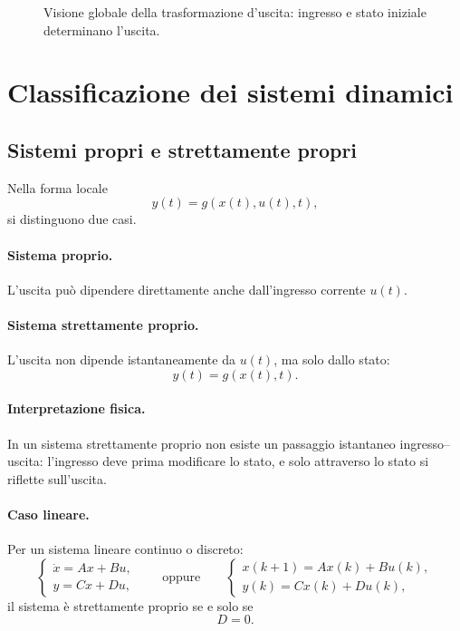 \begin{figure}[H]
\centering
{}
\caption{Visione globale della trasformazione d'uscita: ingresso e stato iniziale determinano l'uscita.}
\end{figure}

\section{Classificazione dei sistemi dinamici}

\subsection{Sistemi propri e strettamente propri}

Nella forma locale
\[
y(t)=g(x(t),u(t),t),
\]
si distinguono due casi.

\paragraph{Sistema proprio.}
L'uscita può dipendere direttamente anche dall'ingresso corrente $u(t)$.

\paragraph{Sistema strettamente proprio.}
L'uscita non dipende istantaneamente da $u(t)$, ma solo dallo stato:
\[
y(t)=g(x(t),t).
\]

\paragraph{Interpretazione fisica.}
In un sistema strettamente proprio non esiste un passaggio istantaneo ingresso--uscita: l'ingresso deve prima modificare lo stato, e solo attraverso lo stato si riflette sull'uscita.

\paragraph{Caso lineare.}
Per un sistema lineare continuo o discreto:
\[
\begin{cases}
\dot x = Ax + Bu,\\
y = Cx + Du,
\end{cases}
\qquad \text{oppure} \qquad
\begin{cases}
x(k+1)=Ax(k)+Bu(k),\\
y(k)=Cx(k)+Du(k),
\end{cases}
\]
il sistema è strettamente proprio se e solo se
\[
D=0.
\]

